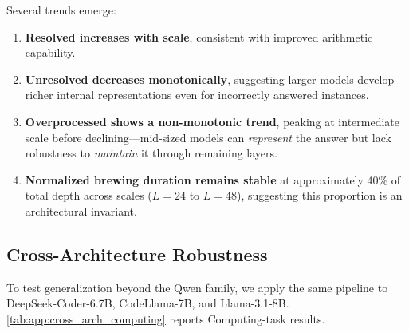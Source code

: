 Several trends emerge:

\begin{enumerate}
\item \textbf{Resolved increases with scale}, consistent with improved arithmetic capability.

\item \textbf{Unresolved decreases monotonically}, suggesting larger models develop richer internal representations even for incorrectly answered instances.

\item \textbf{Overprocessed shows a non-monotonic trend}, peaking at intermediate scale before declining---mid-sized models can \emph{represent} the answer but lack robustness to \emph{maintain} it through remaining layers.

\item \textbf{Normalized brewing duration remains stable} at approximately 40\% of total depth across scales ($L=24$ to $L=48$), suggesting this proportion is an architectural invariant.
\end{enumerate}


\subsection{Cross-Architecture Robustness}
\label{app:subsec:cross_architecture_robustness}

To test generalization beyond the Qwen family, we apply the same pipeline to DeepSeek-Coder-6.7B, CodeLlama-7B, and Llama-3.1-8B.
\cref{tab:app:cross_arch_computing} reports Computing-task results.

\begin{table}[H]
\centering
\caption{Cross-architecture results on Computing.  All three non-Qwen
models exhibit the four-way outcome split and identifiable FPCL/FJC
positions.  Normalized depths in parentheses.}
\label{tab:app:cross_arch_computing}
\end{table}

